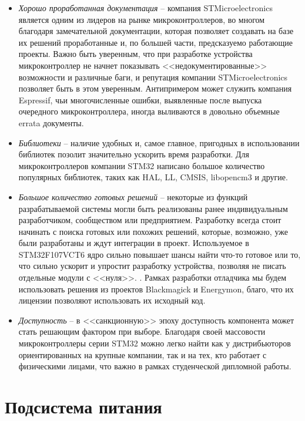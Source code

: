 \begin{itemize}
    \item \textit{Хорошо проработанная документация} -- компания
     STMicroelectronics является одним из лидеров на рынке микроконтроллеров, во многом благодаря
     замечательной документации, которая позволяет создавать на базе их решений проработанные
     и, по большей части, предсказуемо работающие проекты. Важно быть уверенным, что при разработке
     устройства микроконтроллер не начнет показывать <<недокументированные>> возможности и
     различные баги, и репутация компании STMicroelectronics позволяет быть в этом
     уверенным. Антипримером может служить компания Espressif, чьи многочисленные ошибки,
     выявленные после выпуска очередного микроконтроллера, иногда выливаются в довольно
     объемные errata документы.
    \item \textit{Библиотеки} -- наличие удобных и, самое главное, пригодных в использовании 
     библиотек позолит значительно ускорить время разработки. Для микроконтроллеров
     компании STM32 написано большое количество популярных библиотек, таких
     как HAL, LL, CMSIS, libopencm3 и другие.
    \item \textit{Большое количество готовых решений} -- некоторые из функций разрабатываемой
     системы могли быть реализованы ранее индивидуальным разработчиком, 
     сообществом или предприятием. Разработку всегда стоит начинать с поиска готовых или похожих 
     решений, которые, возможно, уже были разработаны и ждут интеграции в проект. Используемое
     в STM32F107VCT6 ядро сильно повышает шансы найти что-то готовое или то, что сильно 
     ускорит и упростит разработку устройства, позволяя не писать отдельные модули с <<нуля>>.
     \cite{Lakamera:embed}. Рамках разработки отладчика мы будем использовать решения из проектов 
     Blackmagick и Energymon, благо, что их лицензии позволяют использовать их исходный код.
    \item \textit{Доступность} -- в <<санкционную>> эпоху доступность компонента может стать 
     решающим фактором при выборе. Благодаря своей массовости микроконтроллеры серии STM32 
     можно легко найти как у дистрибьюторов ориентированных на крупные компании, так и на тех,
     кто работает с физическими лицами, что важно в рамках студенческой дипломной работы.
\end{itemize}

\section{Подсистема питания}
\hspace{1cm} 

